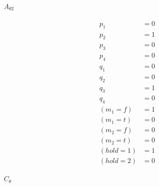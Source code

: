 \documentclass{article}
\begin{document}
\paragraph{$A_{\theta 2}$}
\begin{align*}
  p_1 &= 0 \\
  p_2 &= 1 \\
  p_3 &= 0 \\
  p_4 &= 0 \\
  q_1 &= 0 \\
  q_2 &= 0 \\
  q_3 &= 1 \\
  q_4 &= 0 \\
  (m_1=f) &= 1 \\
  (m_1=t) &= 0 \\
  (m_2=f) &= 0 \\
  (m_2=t) &= 0 \\
  (hold=1) &= 1 \\
  (hold=2) &= 0
\end{align*}

\paragraph{$C_\theta$}
\end{document}
